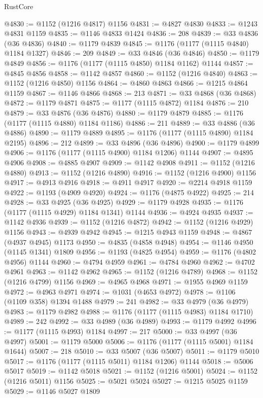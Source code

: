 \begin{lexlean}{RustCore}
\begin{coremodule}
@4830 := @1152 (@1216 @4817) @1156
@4831 := @4827 @4830
@4833 := @1243 @4831 @1159
@4835 := @1146 @4833 @1424
@4836 := 208
@4839 := @33 @4836 (@36 @4836)
@4840 := @1179 @4839
@4845 := @1176 (@1177 (@1115 @4840) @1184 @1327)
@4846 := 209
@4849 := @33 @4846 (@36 @4846)
@4850 := @1179 @4849
@4856 := @1176 (@1177 (@1115 @4850) @1184 @1162) @1144
@4857 := @4845 @4856
@4858 := @1142 @4857
@4860 := @1152 (@1216 @4840)
@4863 := @1152 (@1216 @4850) @1156
@4864 := @4860 @4863
@4866 := @1215 @4864 @1159
@4867 := @1146 @4866
@4868 := 213
@4871 := @33 @4868 (@36 @4868)
@4872 := @1179 @4871
@4875 := @1177 (@1115 @4872) @1184
@4876 := 210
@4879 := @33 @4876 (@36 @4876)
@4880 := @1179 @4879
@4885 := @1176 (@1177 (@1115 @4880) @1184 @1186)
@4886 := 211
@4889 := @33 @4886 (@36 @4886)
@4890 := @1179 @4889
@4895 := @1176 (@1177 (@1115 @4890) @1184 @2195)
@4896 := 212
@4899 := @33 @4896 (@36 @4896)
@4900 := @1179 @4899
@4906 := @1176 (@1177 (@1115 @4900) @1184 @1206) @1144
@4907 := @4895 @4906
@4908 := @4885 @4907
@4909 := @1142 @4908
@4911 := @1152 (@1216 @4880)
@4913 := @1152 (@1216 @4890)
@4916 := @1152 (@1216 @4900) @1156
@4917 := @4913 @4916
@4918 := @4911 @4917
@4920 := @2214 @4918 @1159
@4922 := @1193 (@4909 @4920)
@4924 := @1176 (@4875 @4922)
@4925 := 214
@4928 := @33 @4925 (@36 @4925)
@4929 := @1179 @4928
@4935 := @1176 (@1177 (@1115 @4929) @1184 @1341) @1144
@4936 := @4924 @4935
@4937 := @1142 @4936
@4939 := @1152 (@1216 @4872)
@4942 := @1152 (@1216 @4929) @1156
@4943 := @4939 @4942
@4945 := @1215 @4943 @1159
@4948 := @4867 (@4937 @4945) @1173
@4950 := @4835 (@4858 @4948)
@4954 := @1146 @4950 (@1145 @1341) @1809
@4956 := @1193 (@4825 @4954)
@4959 := @1176 (@4802 @4956) @1144
@4960 := @4794 @4959
@4961 := @4784 @4960
@4962 := @4702 @4961
@4963 := @1142 @4962
@4965 := @1152 (@1216 @4789)
@4968 := @1152 (@1216 @4799) @1156
@4969 := @4965 @4968
@4971 := @1955 @4969 @1159
@4972 := @4963 @4971
@4974 := @1031 (@4653 @4972)
@4978 := @1106 (@1109 @358) @1394 @1488
@4979 := 241
@4982 := @33 @4979 (@36 @4979)
@4983 := @1179 @4982
@4988 := @1176 (@1177 (@1115 @4983) @1184 @1710)
@4989 := 242
@4992 := @33 @4989 (@36 @4989)
@4993 := @1179 @4992
@4996 := @1177 (@1115 @4993) @1184
@4997 := 217
@5000 := @33 @4997 (@36 @4997)
@5001 := @1179 @5000
@5006 := @1176 (@1177 (@1115 @5001) @1184 @1644)
@5007 := 218
@5010 := @33 @5007 (@36 @5007)
@5011 := @1179 @5010
@5017 := @1176 (@1177 (@1115 @5011) @1184 @1206) @1144
@5018 := @5006 @5017
@5019 := @1142 @5018
@5021 := @1152 (@1216 @5001)
@5024 := @1152 (@1216 @5011) @1156
@5025 := @5021 @5024
@5027 := @1215 @5025 @1159
@5029 := @1146 @5027 @1809

\end{coremodule}
\end{lexlean}
